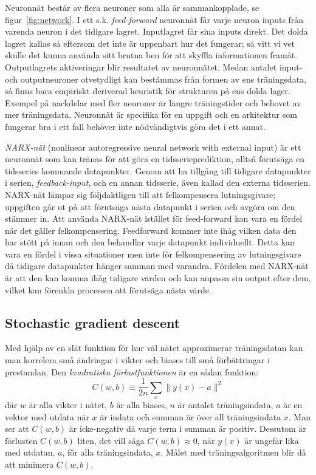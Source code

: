 Neuronnät består av flera neuroner som alla är sammankopplade, se figur~\ref{fig:network}.
I ett s.k. \textit{feed-forward} neuronnät får varje neuron inputs från
varenda neuron i det tidigare lagret.
Inputlagret får sina inputs direkt.
Det dolda lagret kallas så eftersom det inte är uppenbart hur det fungerar;
så vitt vi vet skulle det kunna använda sitt brutna ben
för att skyffla informationen framåt.
Outputlagrets aktiveringar blir resultatet av neuronnätet.
Medan antalet input- och outputneuroner otvetydligt kan bestämmas
från formen av ens träningsdata,
så finns bara empiriskt deriverad heuristik för strukturen på ens dolda lager.
Exempel på nackdelar med fler neuroner är längre träningstider
och behovet av mer träningsdata.
Neuronnät är specifika för en uppgift och en arkitektur som
fungerar bra i ett fall behöver inte nödvändigtvis göra det i ett annat.
\autocite{nielsen15}

\textit{NARX-nät} (nonlinear autoregressive neural network with external input)
är ett neuronnät som kan tränas för att göra en tidsserieprediktion, alltså
förutsäga en tidsseries kommande datapunkter.
Genom att ha tillgång till tidigare datapunkter i serien,
\textit{feedback-input}, och en annan tidsserie, även kallad den externa
tidsserien.
NARX-nät lämpar sig följdaktligen till att felkompensera lutningsgivare;
uppgiften går ut på att förutsäga nästa datapunkt i serien och avgöra om den
stämmer in.\autocite{narxnet} 
Att använda NARX-nät istället för feed-forward 
kan vara en fördel när det gäller felkompensering. Feedforward kommer 
inte ihåg vilken data den har stött på innan och den behandlar varje datapunkt 
individuellt. Detta kan vara en fördel i vissa situationer men inte för felkompensering
av lutningsgivare då tidigare datapunkter hänger samman med varandra. 
Fördelen med NARX-nät är att den kan komma ihåg tidigare värden och kan
anpassa sin output efter dem, vilket kan förenkla processen att förutsäga nästa värde.

\subsection{Stochastic gradient descent}
\label{sec:sdg}
Med hjälp av en slät funktion för hur väl nätet approximerar träningsdatan
kan man korrelera små ändringar i vikter och biases
till små förbättringar i prestandan.
Den \emph{kvadratiska förlustfunktionen} är en sådan funktion:
\begin{equation} \label{eq:cost}
	C(w, b) \equiv \frac{1}{2n} \displaystyle\sum_x \lVert y(x) - a \rVert^2
\end{equation}
där $ w $ är alla vikter i nätet, $ b $ är alla biases,
$ n $ är antalet träningsindata, $ a $ är en vektor med utdata när $ x $ är indata
och summan är över all träningsindata $ x $.
Man ser att $ C(w, b) $ är icke-negativ då varje term i summan är positiv.
Dessutom är förlusten $ C(w, b) $ liten, det vill säga $ C(w, b) \approx 0 $,
när $ y(x) $ är ungefär lika med utdatan, $ a $, för alla träningsindata, $ x $.
Målet med träningsalgoritmen blir då att minimera $ C(w, b) $.

